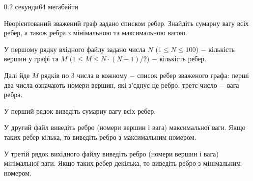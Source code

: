 \begin{problem}{}{}{}{0.2 секунди}{64 мегабайти}

Неорієнтований зважений граф задано списком ребер. Знайдіть сумарну вагу всіх ребер, а також ребра з мінімальною та максимальною вагою.

\InputFile
У першому рядку вхідного файлу задано числа $N$ ($1 \le N \le 100$) $-$ кількість вершин у графі та $M$ ($1 \le M \le N\cdot(N-1)/2$) $-$ кількість ребер.

Далі йде $M$ рядків по $3$ числа в кожному $-$ список ребер зваженого графа: перші два числа означають номери вершин, які з'єднує це ребро, третє число $-$ вага ребра.
 
\OutputFile
У перший рядок виведіть сумарну вагу всіх ребер.

У другий файл виведіть ребро (номери вершин і вага) максимальної ваги. 
Якщо таких ребер кілька, то виведіть ребро з максимальним номером.

У третій рядок вихідного файлу виведіть ребро (номери вершин і вага) мінімальної ваги. 
Якщо таких ребер декілька, то виведіть ребро з мінімальним номером.

\Example

\begin{example}
%
\end{example}

\end{problem}
